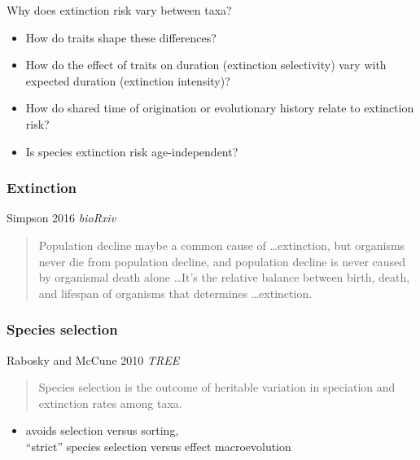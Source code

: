 \documentclass{beamer}
\begin{document}
\begin{frame}
  \begin{alertblock}{Why does extinction risk vary between taxa?}
    \begin{itemize}
      \item How do traits shape these differences?
      \item How do the effect of traits on duration (\alert{extinction selectivity}) vary with expected duration (\alert{extinction intensity})?
      \item How do shared time of origination or evolutionary history relate to extinction risk?
      \item Is species extinction risk age-independent?
    \end{itemize}
  \end{alertblock}
\end{frame}


\begin{frame}
  \frametitle{Extinction}
  \begin{block}{Simpson 2016 \em{bioRxiv}}
    \begin{quote}
      Population decline maybe a common cause of \dots extinction, but organisms never die from population decline, and population decline is never caused by organismal death alone \dots It's the relative balance between birth, death, and lifespan of organisms that determines \dots extinction. 
    \end{quote}
  \end{block}
\end{frame}

\begin{frame}
  \frametitle{Species selection}

  \begin{block}{Rabosky and McCune 2010 \em{TREE}}
    \begin{quote}
      Species selection is the outcome of heritable variation in speciation and extinction rates among taxa.
    \end{quote}
  \end{block}

  \begin{itemize}
    \item avoids selection versus sorting, \\``strict'' species selection versus effect macroevolution
  \end{itemize}
\end{frame}
\end{document}
